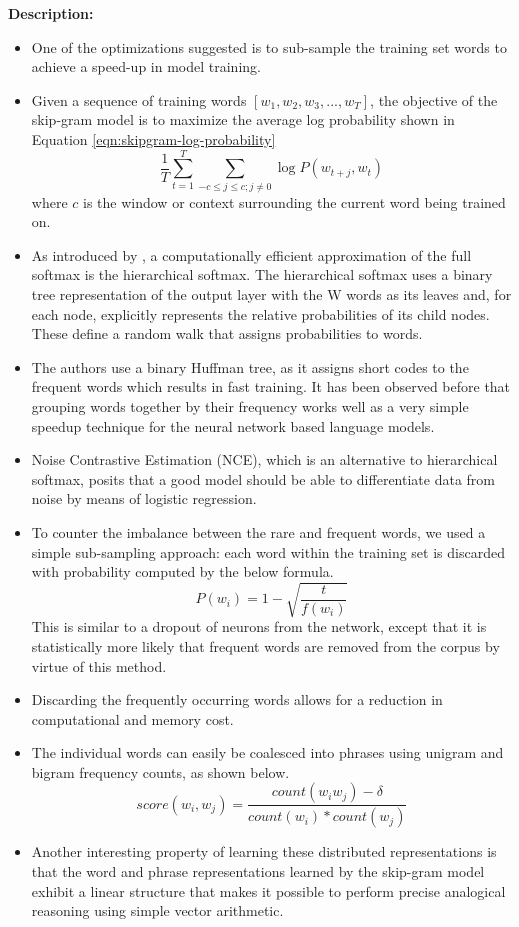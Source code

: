 \documentclass[11pt,a4paper]{article}
\begin{document}
  \textbf{Description:}
  \begin{itemize}
    \item
    One of the optimizations suggested is to sub-sample the training set words to achieve a speed-up in model training.
    \item
    Given a sequence of training words $[w_1 , w_2 , w_3 , ... , w_T]$, the objective of the skip-gram model is to maximize the average log probability shown in Equation \ref{eqn:skipgram-log-probability}
    \begin{equation} \label{eqn:skipgram-log-probability}
      \frac{1}{T} \sum_{t=1}^T \sum_{-c \leq j \leq c; j \neq 0} \log P(w_{t+j}, w_t)
    \end{equation}
    where $c$ is the window or context surrounding the current word being trained on. 
    \item 
    As introduced by \cite{morin2005hierarchical}, a computationally efficient approximation of the full softmax is the hierarchical softmax. The hierarchical softmax uses a binary tree representation of the output layer with the W words as its leaves and, for each node, explicitly represents the relative probabilities of its child nodes. These define a random walk that assigns probabilities to words.
    \item 
    The authors use a binary Huffman tree, as it assigns short codes to the frequent words which results in fast training. It has been observed before that grouping words together by their frequency works well as a very simple speedup technique for the neural network based language models.
    \item
    Noise Contrastive Estimation (NCE), which is an alternative to hierarchical softmax,  posits that a good model should be able to differentiate data from noise by means of logistic regression.
    \item
    To counter the imbalance between the rare and frequent words, we used a simple sub-sampling approach: each word within the training set is discarded with probability computed by the below formula.
    $$P(w_i) = 1 - \sqrt{\frac{t}{f(w_i)}} $$
    This is similar to a dropout of neurons from the network, except that it is statistically more likely that frequent words are removed from the corpus by virtue of this method.
    \item
    Discarding the frequently occurring words allows for a reduction in computational and memory cost.
    \item
    The individual words can easily be coalesced into phrases using unigram and bigram frequency counts, as shown below.
    $$score(w_i, w_j) = \frac{count(w_i w_j) - \delta}{count(w_i) * count(w_j)} $$
    \item
    Another interesting property of learning these distributed representations is that the word and phrase representations learned by the skip-gram model exhibit a linear structure that makes it possible to perform precise analogical reasoning using simple vector arithmetic.
  \end{itemize}
\end{document}
